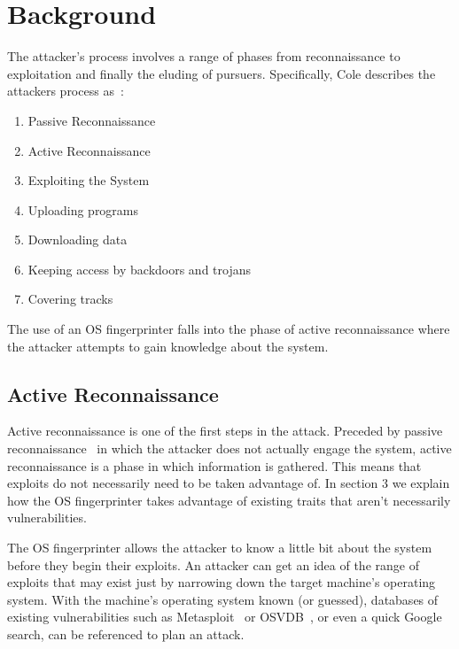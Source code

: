 \section{Background}

The attacker's process involves a range of phases from reconnaissance to exploitation and finally the eluding of pursuers. Specifically, Cole describes the attackers process as~\cite{Cole02}:

\begin{enumerate}
	\item Passive Reconnaissance
	\item Active Reconnaissance
	\item Exploiting the System
	\item Uploading programs
	\item Downloading data
	\item Keeping access by backdoors and trojans
	\item Covering tracks
\end{enumerate}

The use of an OS fingerprinter falls into the phase of active reconnaissance where the attacker attempts to gain knowledge about the system. 

\subsection{Active Reconnaissance}
Active reconnaissance is one of the first steps in the attack. Preceded by passive reconnaissance~\cite{Rouse12} in which the attacker does not actually engage the system, active reconnaissance is a phase in which information is gathered. This means that exploits do not necessarily need to be taken advantage of. In section 3 we explain how the OS fingerprinter takes advantage of existing traits that aren't necessarily vulnerabilities.

The OS fingerprinter allows the attacker to know a little bit about the system before they begin their exploits. An attacker can get an idea of the range of exploits that may exist just by narrowing down the target machine's operating system. With the machine's operating system known (or guessed), databases of existing vulnerabilities such as Metasploit~\cite{Metasploit1} or OSVDB~\cite{OSVDB1}, or even a quick Google search, can be referenced to plan an attack.


